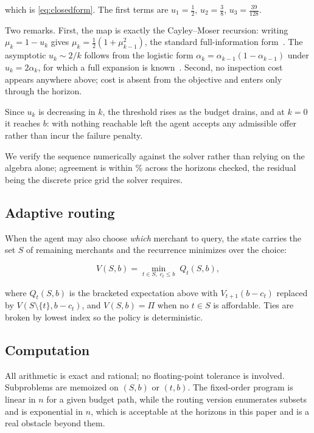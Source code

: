 which is \eqref{eq:closedform}. The first terms are $u_1 = \tfrac12$,
$u_2 = \tfrac38$, $u_3 = \tfrac{39}{128}$.

Two remarks. First, the map is exactly the Cayley--Moser recursion: writing
$\mu_k = 1 - u_k$ gives $\mu_k = \tfrac12(1 + \mu_{k-1}^2)$, the standard
full-information form~\citep{gilbert1966recognizing,ferguson1989secretary}. The
asymptotic $u_k \sim 2/k$ follows from the logistic form
$\alpha_k = \alpha_{k-1}(1 - \alpha_{k-1})$ under $u_k = 2\alpha_k$, for which a
full expansion is known~\citep{finch2024quadratic}. Second, no inspection cost
appears anywhere above; cost is absent from the objective and enters only through
the horizon.

Since $u_k$ is decreasing in $k$, the threshold rises as the budget drains, and at
$k = 0$ it reaches $b$: with nothing reachable left the agent accepts any admissible
offer rather than incur the failure penalty.

We verify the sequence numerically against the solver rather than relying on the
algebra alone; agreement is within \ResultClosedFormMaxRelativeErrorPercent\% across
the horizons checked, the residual being the discrete price grid the solver requires.

\subsection{Adaptive routing}

When the agent may also choose \emph{which} merchant to query, the state carries the
set $S$ of remaining merchants and the recurrence minimizes over the choice:

\begin{equation}
  V(S, b) = \min_{t \in S,\; c_t \le b} \; Q_t(S, b),
\end{equation}

where $Q_t(S, b)$ is the bracketed expectation above with $V_{t+1}(b - c_t)$ replaced
by $V(S \setminus \{t\}, b - c_t)$, and $V(S,b) = \Pi$ when no $t \in S$ is
affordable. Ties are broken by lowest index so the policy is deterministic.

\subsection{Computation}

All arithmetic is exact and rational; no floating-point tolerance is involved.
Subproblems are memoized on $(S, b)$ or $(t, b)$. The fixed-order program is linear
in $n$ for a given budget path, while the routing version enumerates subsets and is
exponential in $n$, which is acceptable at the horizons in this paper and is a real
obstacle beyond them.

